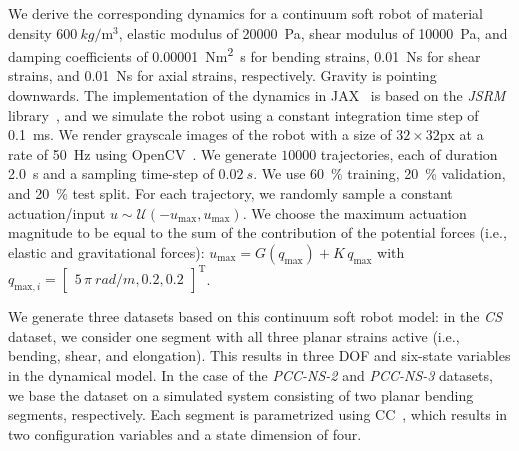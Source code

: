 
We derive the corresponding dynamics for a continuum soft robot of material density $\SI{600}{kg \per \meter^3}$, elastic modulus of \SI{20000}{Pa}, shear modulus of \SI{10000}{Pa}, and damping coefficients of \SI{0.00001}{Nm^2s} for bending strains, \SI{0.01}{Ns} for shear strains, and \SI{0.01}{Ns} for axial strains, respectively.
Gravity is pointing downwards.
The implementation of the dynamics in JAX~\cite{jax2018github} is based on the \emph{JSRM} library~\cite{stolzle2024experimental, stolzle2024guiding}, and we simulate the robot using a constant integration time step of \SI{0.1}{ms}.
We render grayscale images of the robot with a size of $32 \times 32 \mathrm{px}$ at a rate of \SI{50}{Hz} using OpenCV~\cite{opencv_library}. 
We generate $10000$ trajectories, each of duration \SI{2.0}{s} and a sampling time-step of $\SI{0.02}{s}$. We use \SI{60}{\percent} training, \SI{20}{\percent} validation, and \SI{20}{\percent} test split.
For each trajectory, we randomly sample a constant actuation/input $u \sim \mathcal{U}(-u_\mathrm{max}, u_\mathrm{max})$. We choose the maximum actuation magnitude to be equal to the sum of the contribution of the potential forces (i.e., elastic and gravitational forces): $u_\mathrm{max} = G(q_\mathrm{max}) + K \, q_\mathrm{max}$ with $q_{\mathrm{max},i} = \begin{bmatrix}
    5 \, \pi~\si{rad \per m}, 0.2, 0.2
\end{bmatrix}^\mathrm{T}$.

We generate three datasets based on this continuum soft robot model: in the \emph{CS} dataset, we consider one segment with all three planar strains active (i.e., bending, shear, and elongation). This results in three \gls{DOF} and six-state variables in the dynamical model. In the case of the \emph{PCC-NS-2} and \emph{PCC-NS-3} datasets, we base the dataset on a simulated system consisting of two planar bending segments, respectively. Each segment is parametrized using \gls{CC}~\cite{webster2010design, rosi2022sensing}, which results in two configuration variables and a state dimension of four.

